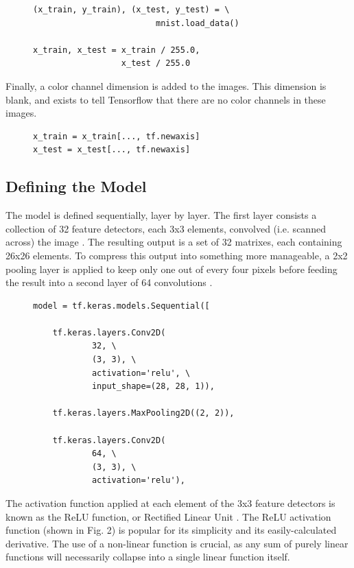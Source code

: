 \documentclass[transmag]{IEEEtran}
\begin{document}
\begin{figure}[H]
\begin{Verbatim}
(x_train, y_train), (x_test, y_test) = \
                         mnist.load_data()

x_train, x_test = x_train / 255.0,
                  x_test / 255.0
\end{Verbatim}
\end{figure}

\noindent Finally, a color channel dimension is added to the images. This
dimension is blank, and exists to tell Tensorflow that there are no color
channels in these images.

\begin{figure}[H]
\begin{Verbatim}
x_train = x_train[..., tf.newaxis]
x_test = x_test[..., tf.newaxis]
\end{Verbatim}
\end{figure}

\subsection{Defining the Model}

The model is defined sequentially, layer by layer. The first layer consists
a collection of 32 feature detectors, each 3x3 elements, convolved (i.e. 
scanned across) the image \cite{ref2}. The resulting output is a set of 32 
matrixes, each containing 26x26 elements. To compress this output into 
something more manageable, a 2x2 pooling layer is applied to keep only one out 
of every four pixels before feeding the result into a second layer of 64 
convolutions \cite{ref3}.

\begin{figure}[H]
\begin{Verbatim}
model = tf.keras.models.Sequential([

    tf.keras.layers.Conv2D(
            32, \
            (3, 3), \
            activation='relu', \
            input_shape=(28, 28, 1)),

    tf.keras.layers.MaxPooling2D((2, 2)),

    tf.keras.layers.Conv2D(
            64, \
            (3, 3), \
            activation='relu'),
\end{Verbatim}
\end{figure}

The activation function applied at each element of the 3x3 feature detectors
is known as the ReLU function, or Rectified Linear Unit \cite{ref4}. The ReLU activation 
function (shown in Fig. 2) is popular for its simplicity and its 
easily-calculated derivative. The use of a non-linear function is crucial, as
any sum of purely linear functions will necessarily collapse into a single 
linear function itself.
\end{document}
